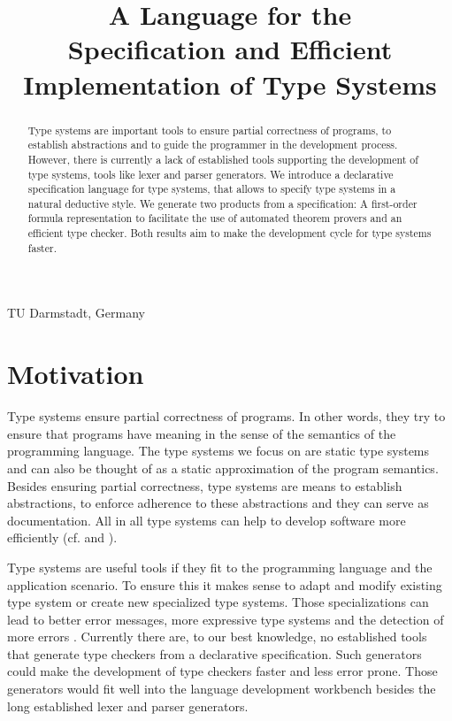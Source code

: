 \documentclass[preprint]{sigplanconf}
\begin{document}
\title{A Language for the \\ Specification and Efficient Implementation
  of Type Systems}

           {TU Darmstadt, Germany}
           {}
\maketitle

\begin{abstract}
  Type systems are important tools to ensure partial correctness of
  programs, to establish abstractions and to guide the programmer in
  the development process. However, there is currently a lack of
  established tools supporting the development of type systems, tools
  like lexer and parser generators. We introduce a declarative
  specification language for type systems, that allows to specify type
  systems in a natural deductive style. We generate two products from
  a specification: A first-order formula representation to facilitate
  the use of automated theorem provers and an efficient type
  checker. Both results aim to make the development cycle for type
  systems faster.
 \end{abstract}

\section{Motivation}
Type systems ensure partial correctness of programs. In other words,
they try to ensure that programs have meaning in the sense of the
semantics of the programming language. The type systems we focus on
are static type systems and can also be thought of as a static
approximation of the program semantics. Besides ensuring partial
correctness, type systems are means to establish abstractions, to
enforce adherence to these abstractions and they can serve as
documentation. All in all type systems can help to develop software
more efficiently (cf. \cite{Petersen:2014:ECS:2597008.2597152} and
\cite{Mayer:2012:ESI:2384616.2384666}).

Type systems are useful tools if they fit to the programming language
and the application scenario. To ensure this it makes sense to adapt
and modify existing type system or create new specialized type
systems. Those specializations can lead to better error messages, more
expressive type systems and the detection of more errors
\cite{Thiemann02programmabletype}. Currently there are, to our best
knowledge, no established tools that generate type checkers from a
declarative specification. Such generators could make the development
of type checkers faster and less error prone. Those generators would
fit well into the language development workbench besides the long
established lexer and parser generators.
\end{document}
